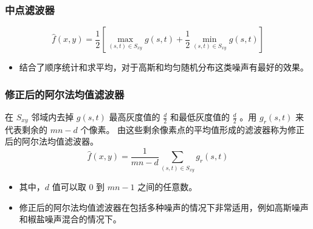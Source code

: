 \documentclass{beamer}
\begin{document}
\begin{frame}
\frametitle{中点滤波器}
\label{sec-6-5}

\[  \hat f(x,y) = \frac{1}{2}\left[\max_{(s,t)\in S_{xy}}g(s,t)+\frac{1}{2}\min_{(s,t)\in S_{xy}}g(s,t)\right] \]
\begin{itemize}
\item 结合了顺序统计和求平均，对于高斯和均匀随机分布这类噪声有最好的效果。
\end{itemize}
\end{frame}
\begin{frame}
\frametitle{修正后的阿尔法均值滤波器}
\label{sec-6-6}

在 $S_{xy}$ 邻域内去掉 $g(s,t)$ 最高灰度值的 $\frac{d}{2}$ 和最低灰度值的 $\frac{d}{2}$ 。用 $g_r(s,t)$ 来代表剩余的 $mn-d$ 个像素。
由这些剩余像素点的平均值形成的滤波器称为修正后的阿尔法均值滤波器。
\[ \hat f(x,y) = \frac{1}{mn-d}\sum_{(s,t)\in S_{xy}}g_r(s,t) \]
\begin{itemize}
\item 其中，$d$ 值可以取 $0$ 到 $mn-1$ 之间的任意数。
\item 修正后的阿尔法均值滤波器在包括多种噪声的情况下非常适用，例如高斯噪声和椒盐噪声混合的情况下。
\end{itemize}
\end{frame}
\end{document}
